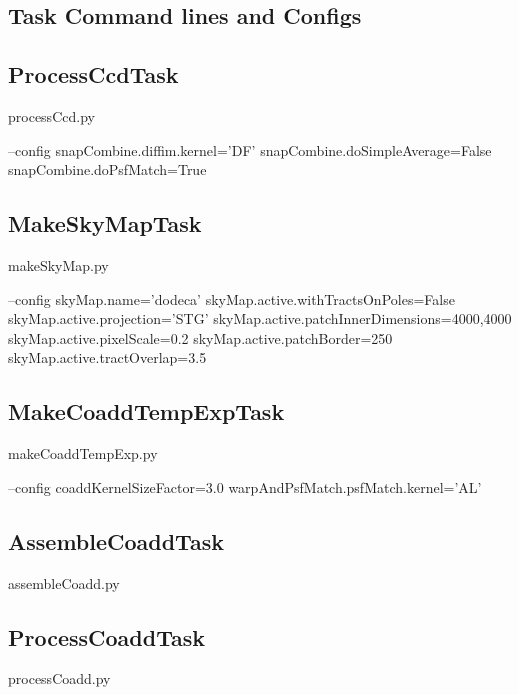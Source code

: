 \documentclass[12pt]{article}
\begin{document}

\clearpage 
\begin{appendices}
\section{Task Command lines and Configs}

\subsection{ProcessCcdTask}
\begin{python}
processCcd.py

--config
snapCombine.diffim.kernel='DF'
snapCombine.doSimpleAverage=False
snapCombine.doPsfMatch=True
\end{python}


\subsection{MakeSkyMapTask}
\begin{python}
makeSkyMap.py

--config
skyMap.name='dodeca'
skyMap.active.withTractsOnPoles=False
skyMap.active.projection='STG'
skyMap.active.patchInnerDimensions=4000,4000
skyMap.active.pixelScale=0.2
skyMap.active.patchBorder=250
skyMap.active.tractOverlap=3.5
\end{python}

\subsection{MakeCoaddTempExpTask} 
\begin{python}
makeCoaddTempExp.py

--config
coaddKernelSizeFactor=3.0
warpAndPsfMatch.psfMatch.kernel='AL'
\end{python}

\subsection{AssembleCoaddTask} 
\begin{python}
assembleCoadd.py
\end{python}

\subsection{ProcessCoaddTask} 
\begin{python}
processCoadd.py
\end{python}


\end{appendices}
\end{document}
